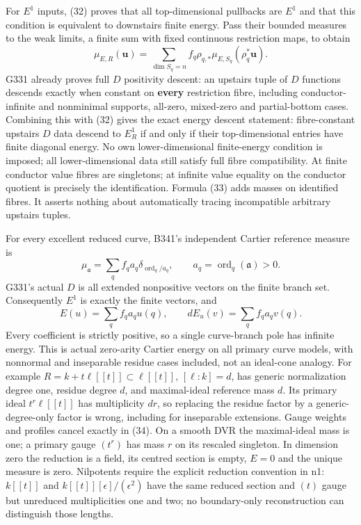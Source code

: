\documentclass[
  11pt,
]{article}
\begin{document}
For \(E^1\) inputs, (32) proves that all top-dimensional pullbacks are
\(E^1\) and that this condition is equivalent to downstairs finite
energy. Pass their bounded measures to the weak limits, a finite sum
with fixed continuous restriction maps, to obtain
\[\mu_{E,R}(\boldsymbol u)=\sum_{\dim S_q=n}f_q\rho_{q,*}\mu_{E,S_q}(\rho_q^*\boldsymbol u).\tag{33}\]
G331 already proves full \(D\) positivity descent: an upstairs tuple of
\(D\) functions descends exactly when constant on \textbf{every}
restriction fibre, including conductor-infinite and nonminimal supports,
all-zero, mixed-zero and partial-bottom cases. Combining this with (32)
gives the exact energy descent statement: fibre-constant upstairs \(D\)
data descend to \(E^1_R\) if and only if their top-dimensional entries
have finite diagonal energy. No own lower-dimensional finite-energy
condition is imposed; all lower-dimensional data still satisfy full
fibre compatibility. At finite conductor value fibres are singletons; at
infinite value equality on the conductor quotient is precisely the
identification. Formula (33) adds masses on identified fibres. It
asserts nothing about automatically tracing incompatible arbitrary
upstairs tuples.

For every excellent reduced curve, B341's independent Cartier reference
measure is
\[\mu_{\mathfrak a}=\sum_q f_q a_q\delta_{\operatorname{ord}_q/a_q},\qquad a_q=\operatorname{ord}_q(\mathfrak a)>0.\]
G331's actual \(D\) is all extended nonpositive vectors on the finite
branch set. Consequently \(E^1\) is exactly the finite vectors, and
\[E(u)=\sum_q f_q a_q u(q),\qquad dE_u(v)=\sum_q f_q a_q v(q).\tag{34}\]
Every coefficient is strictly positive, so a single curve-branch pole
has infinite energy. This is actual zero-arity Cartier energy on all
primary curve models, with nonnormal and inseparable residue cases
included, not an ideal-cone analogy. For example
\(R=k+t\ell[[t]]\subset\ell[[t]]\), \([\ell:k]=d\), has generic
normalization degree one, residue degree \(d\), and maximal-ideal
reference mass \(d\). Its primary ideal \(t^r\ell[[t]]\) has
multiplicity \(dr\), so replacing the residue factor by a
generic-degree-only factor is wrong, including for inseparable
extensions. Gauge weights and profiles cancel exactly in (34). On a
smooth DVR the maximal-ideal mass is one; a primary gauge \((t^r)\) has
mass \(r\) on its rescaled singleton. In dimension zero the reduction is
a field, its centred section is empty, \(E=0\) and the unique measure is
zero. Nilpotents require the explicit reduction convention in n1:
\(k[[t]]\) and \(k[[t]][\epsilon]/(\epsilon^2)\) have the same reduced
section and \((t)\) gauge but unreduced multiplicities one and two; no
boundary-only reconstruction can distinguish those lengths.
\end{document}
